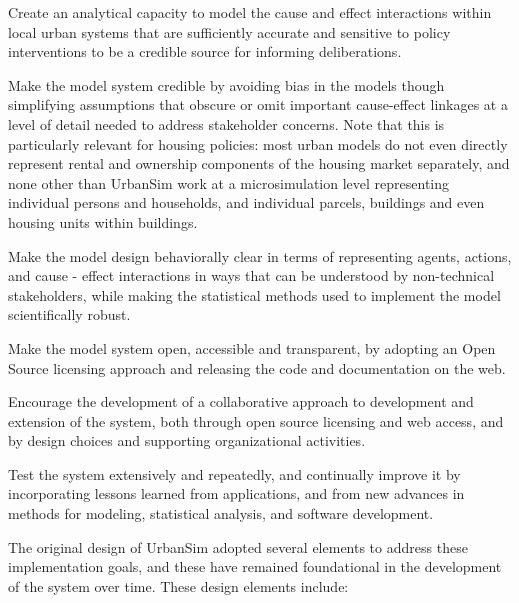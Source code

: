 \squishlist
\item Create an analytical capacity to model the cause and effect interactions within local urban systems that are sufficiently accurate and sensitive to policy interventions to be a credible source for informing deliberations.
\item Make the model system credible by avoiding bias in the models though simplifying assumptions that obscure or omit important cause-effect linkages at a level of detail needed to address stakeholder concerns. Note that this is particularly relevant for housing policies: most urban models do not even directly represent rental and ownership components of the housing market separately, and none other than UrbanSim work at a microsimulation level representing individual persons and households, and individual parcels, buildings and even housing units within buildings.
\item Make the model design behaviorally clear in terms of representing agents, actions, and cause - effect interactions in ways that can be understood by non-technical stakeholders, while making the statistical methods used to implement the model scientifically robust.
\item Make the model system open, accessible and transparent, by adopting an Open Source licensing approach and releasing the code and documentation on the web.
\item Encourage the development of a collaborative approach to development and extension of the system, both through open source licensing and web access, and by design choices and supporting organizational activities.
\item Test the system extensively and repeatedly, and continually improve it by incorporating lessons learned from applications, and from new advances in methods for modeling, statistical analysis, and software development.
\squishend

The original design of UrbanSim adopted several elements to address these implementation goals, and these have remained foundational in the development of the system over time.  These design elements include:

